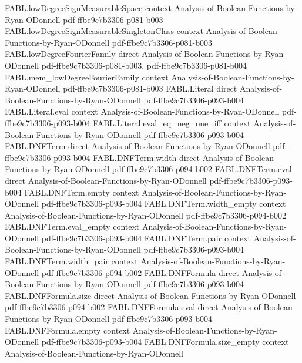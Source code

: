 \begin{theorem}
\proofstep
  {FABL.lowDegreeSignMeasurableSpace}
  {context}
  {Analysis-of-Boolean-Functions-by-Ryan-ODonnell}
  {pdf-ffbe9c7b3306-p081-b003}
\proofstep
  {FABL.lowDegreeSignMeasurableSingletonClass}
  {context}
  {Analysis-of-Boolean-Functions-by-Ryan-ODonnell}
  {pdf-ffbe9c7b3306-p081-b003}
\proofstep
  {FABL.lowDegreeFourierFamily}
  {direct}
  {Analysis-of-Boolean-Functions-by-Ryan-ODonnell}
  {pdf-ffbe9c7b3306-p081-b003,
    pdf-ffbe9c7b3306-p081-b004}
\proofstep
  {FABL.mem_lowDegreeFourierFamily}
  {context}
  {Analysis-of-Boolean-Functions-by-Ryan-ODonnell}
  {pdf-ffbe9c7b3306-p081-b003}
\proofstep
  {FABL.Literal}
  {direct}
  {Analysis-of-Boolean-Functions-by-Ryan-ODonnell}
  {pdf-ffbe9c7b3306-p093-b004}
\proofstep
  {FABL.Literal.eval}
  {context}
  {Analysis-of-Boolean-Functions-by-Ryan-ODonnell}
  {pdf-ffbe9c7b3306-p093-b004}
\proofstep
  {FABL.Literal.eval_eq_neg_one_iff}
  {context}
  {Analysis-of-Boolean-Functions-by-Ryan-ODonnell}
  {pdf-ffbe9c7b3306-p093-b004}
\proofstep
  {FABL.DNFTerm}
  {direct}
  {Analysis-of-Boolean-Functions-by-Ryan-ODonnell}
  {pdf-ffbe9c7b3306-p093-b004}
\proofstep
  {FABL.DNFTerm.width}
  {direct}
  {Analysis-of-Boolean-Functions-by-Ryan-ODonnell}
  {pdf-ffbe9c7b3306-p094-b002}
\proofstep
  {FABL.DNFTerm.eval}
  {direct}
  {Analysis-of-Boolean-Functions-by-Ryan-ODonnell}
  {pdf-ffbe9c7b3306-p093-b004}
\proofstep
  {FABL.DNFTerm.empty}
  {context}
  {Analysis-of-Boolean-Functions-by-Ryan-ODonnell}
  {pdf-ffbe9c7b3306-p093-b004}
\proofstep
  {FABL.DNFTerm.width_empty}
  {context}
  {Analysis-of-Boolean-Functions-by-Ryan-ODonnell}
  {pdf-ffbe9c7b3306-p094-b002}
\proofstep
  {FABL.DNFTerm.eval_empty}
  {context}
  {Analysis-of-Boolean-Functions-by-Ryan-ODonnell}
  {pdf-ffbe9c7b3306-p093-b004}
\proofstep
  {FABL.DNFTerm.pair}
  {context}
  {Analysis-of-Boolean-Functions-by-Ryan-ODonnell}
  {pdf-ffbe9c7b3306-p093-b004}
\proofstep
  {FABL.DNFTerm.width_pair}
  {context}
  {Analysis-of-Boolean-Functions-by-Ryan-ODonnell}
  {pdf-ffbe9c7b3306-p094-b002}
\proofstep
  {FABL.DNFFormula}
  {direct}
  {Analysis-of-Boolean-Functions-by-Ryan-ODonnell}
  {pdf-ffbe9c7b3306-p093-b004}
\proofstep
  {FABL.DNFFormula.size}
  {direct}
  {Analysis-of-Boolean-Functions-by-Ryan-ODonnell}
  {pdf-ffbe9c7b3306-p094-b002}
\proofstep
  {FABL.DNFFormula.eval}
  {direct}
  {Analysis-of-Boolean-Functions-by-Ryan-ODonnell}
  {pdf-ffbe9c7b3306-p093-b004}
\proofstep
  {FABL.DNFFormula.empty}
  {context}
  {Analysis-of-Boolean-Functions-by-Ryan-ODonnell}
  {pdf-ffbe9c7b3306-p093-b004}
\proofstep
  {FABL.DNFFormula.size_empty}
  {context}
  {Analysis-of-Boolean-Functions-by-Ryan-ODonnell}

\end{theorem}
